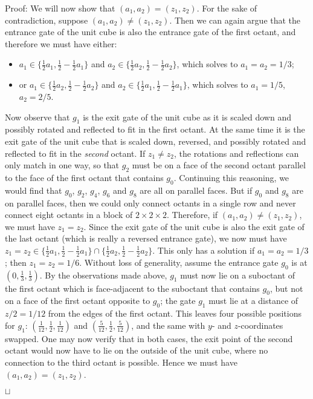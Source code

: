 \documentclass[11pt,a4paper]{article}
\newenvironment{proof}{Proof:}{\qed}
\def\squareforqed{\hbox{\rlap{$\sqcap$}$\sqcup$}}
\def\qed{\ifmmode\squareforqed\else{\unskip\nobreak\hfil
\penalty50\hskip1em\null\nobreak\hfil\squareforqed
\parfillskip=0pt\finalhyphendemerits=0\endgraf}\fi}
\begin{document}
\begin{proof}
We will now show that $(a_1,a_2) = (z_1,z_2)$. For the sake of contradiction, suppose $(a_1,a_2) \neq (z_1,z_2)$. Then we can again argue that the entrance gate of the unit cube is also the entrance gate of the first octant, and therefore we must have either:\begin{itemize}
\item $a_1 \in \{\frac12 a_1, \frac12 - \frac12 a_1\}$ and $a_2 \in \{\frac12 a_2, \frac12 - \frac12 a_2\}$, which solves to $a_1 = a_2 = 1/3$;
\item or $a_1 \in \{\frac12 a_2, \frac12 - \frac12 a_2\}$ and $a_2 \in \{\frac12 a_1, \frac12 - \frac12 a_1\}$, which solves to $a_1 = 1/5$, $a_2 = 2/5$.
\end{itemize}
Now observe that $g_1$ is the exit gate of the unit cube as it is scaled down and possibly rotated and reflected to fit in the first octant. At the same time it is the exit gate of the unit cube that is scaled down, reversed, and possibly rotated and reflected to fit in the \emph{second} octant. If $z_1 \neq z_2$, the rotations and reflections can only match in one way, so that $g_2$ must be on a face of the second octant parallel to the face of the first octant that contains $g_0$. Continuing this reasoning, we would find that $g_0$, $g_2$, $g_4$, $g_6$ and $g_8$ are all on parallel faces. But if $g_0$ and $g_8$ are on parallel faces, then we could only connect octants in a single row and never connect eight octants in a block of $2\times2\times2$. Therefore, if $(a_1,a_2) \neq (z_1,z_2)$, we must have $z_1 = z_2$. Since the exit gate of the unit cube is also the exit gate of the last octant (which is really a reversed entrance gate), we now must have $z_1 = z_2 \in \{\frac12 a_1, \frac12 - \frac12 a_1\} \cap \{\frac12 a_2, \frac12 - \frac12 a_2\}$. This only has a solution if $a_1 = a_2 = 1/3$; then $z_1 = z_2 = 1/6$. Without loss of generality, assume the entrance gate $g_0$ is at $(0,\frac13,\frac13)$. By the observations made above, $g_1$ must now lie on a suboctant of the first octant which is face-adjacent to the suboctant that contains $g_0$, but not on a face of the first octant opposite to $g_0$; the gate $g_1$ must lie at a distance of $z/2 = 1/12$ from the edges of the first octant. This leaves four possible positions for $g_1$: $(\frac1{12},\frac12,\frac1{12})$ and $(\frac5{12},\frac12,\frac5{12})$, and the same with $y$- and $z$-coordinates swapped. One may now verify that in both cases, the exit point of the second octant would now have to lie on the outside of the unit cube, where no connection to the third octant is possible. Hence we must have $(a_1,a_2) = (z_1,z_2)$.


\end{proof}
\end{document}
